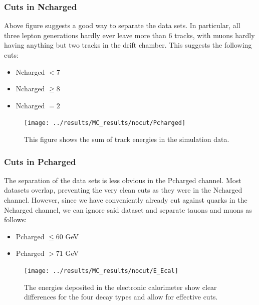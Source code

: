 \subsubsection{Cuts in Ncharged}
Above figure suggests a good way to separate the data sets. In particular, all three lepton generations hardly ever leave more than 6 tracks, with muons hardly having anything but two tracks in the drift chamber. This suggests the following cuts:

\begin{itemize}
	\item{ Ncharged $<7$}
	\item{ Ncharged $\ge8$}
	\item{ Ncharged $=2$}
\end{itemize}



\newpage
\begin{figure}[H]
\centering
\texttt{[image: ../results/MC\_results/nocut/Pcharged]}
\caption[Pcharged in simulation data]{This figure shows the sum of track energies in the simulation data. }
\label{fig:Pcharged}
\end{figure}

\subsubsection{Cuts in Pcharged}
The separation of the data sets is less obvious in the Pcharged channel. Most datasets overlap, preventing the very clean cuts as they were in the Ncharged channel. However, since we have conveniently already cut against quarks in the Ncharged channel, we can ignore said dataset and separate tauons and muons as follows:
\begin{itemize}
	\item{ Pcharged $\le60$ GeV}
	\item{ Pcharged $>71$ GeV}
\end{itemize}

\newpage
\begin{figure}[H]
\centering
\texttt{[image: ../results/MC\_results/nocut/E\_Ecal]}
\caption[E\_Ecal in simulations]{The energies deposited in the electronic calorimeter show clear differences for the four decay types and allow for effective cuts.}
\label{fig:E_Ecal}
\end{figure}

